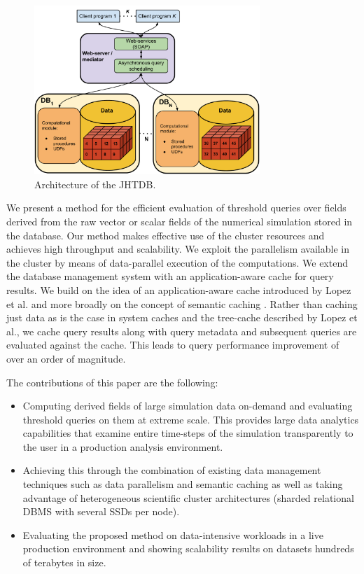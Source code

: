 \documentclass{sig-alternate}
\begin{document}
\begin{figure}
\centering
\includegraphics[width=3.35in]{Figures/jhtdb_diagram.pdf}
\caption{Architecture of the JHTDB.}
\label{fig:jhtdb_diagram}
\end{figure}

We present a method for the efficient evaluation of threshold queries over fields derived from the raw vector or scalar fields of the numerical simulation 
stored in the database. 
Our method makes effective use of the cluster resources and achieves high throughput and scalability. 
We exploit the parallelism 
available in the cluster by means of data-parallel execution of the computations. 
We extend the database management system with an
application-aware cache for query results. We build on the idea of an application-aware cache introduced by Lopez et al. \cite{Lopez} and more broadly 
on the concept of semantic caching \cite{Dar}. Rather than caching just data as is the case in system caches and the tree-cache described by Lopez et al.,
we cache query results along with query metadata and subsequent queries are evaluated against the cache.
This leads to query performance improvement of over an order of magnitude.

The contributions of this paper are the following:
\begin{itemize}
\item Computing derived fields of large simulation data on-demand and evaluating threshold queries on them at extreme scale. This provides large
data analytics capabilities that examine entire time-steps of the simulation transparently to the user in a production analysis environment.
\item Achieving this through the combination of existing data management techniques such as data parallelism and semantic caching as well as taking
advantage of heterogeneous scientific cluster architectures (sharded relational DBMS with several SSDs per node).
\item Evaluating the proposed method on data-intensive workloads in a live production environment and showing scalability results on datasets hundreds of terabytes in size.
\end{itemize}
\end{document}
